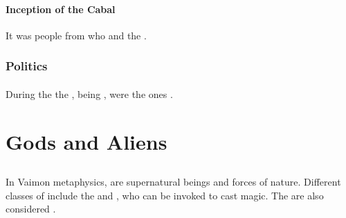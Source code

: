 \subsubsection{Inception of the Cabal}
It was people from \TiphredSerah{} who  and  the . 









\subsection{Politics}





\subsubsection{\Kezerad}
During the  the \TiphredSerah{}, being , were the ones . 

























\chapter{Gods and Aliens}















\section{\Archon}
In Vaimon metaphysics, \Archons{} are supernatural beings and forces of nature. 
Different classes of \Archons{} include the  and , who can be invoked to cast magic. 
The  are also considered \Archons. 















